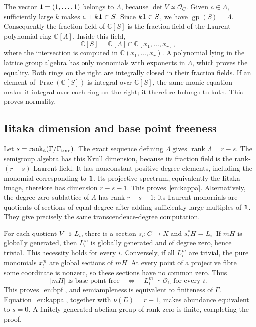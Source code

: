 \documentclass[12pt]{amsart}
\theoremstyle{definition}
\theoremstyle{remark}
\numberwithin{equation}{section}
\newcommand{\rank}{\operatorname{rank}}
\newcommand{\cO}{\mathcal{O}}
\newcommand{\Z}{\mathbb{Z}}
\newcommand{\C}{\mathbb{C}}
\DeclareMathOperator{\gp}{gp}
\begin{document}
The vector ${\bf1}=(1,\ldots,1)$ belongs to $\Lambda$, because $\det V\simeq\cO_C$. Given $a\in\Lambda$, sufficiently large $k$ makes $a+k{\bf1}\in S$. Since $k{\bf1}\in S$, we have $\gp(S)=\Lambda$. Consequently the fraction field of $\C[S]$ is the fraction field of the Laurent polynomial ring $\C[\Lambda]$. Inside this field,
\[
 \C[S]=\C[\Lambda]\cap\C[x_1,\ldots,x_r],
\]
where the intersection is computed in $\C(x_1,\ldots,x_r)$. A polynomial lying in the lattice group algebra has only monomials with exponents in $\Lambda$, which proves the equality. Both rings on the right are integrally closed in their fraction fields. If an element of $\operatorname{Frac}(\C[S])$ is integral over $\C[S]$, the same monic equation makes it integral over each ring on the right; it therefore belongs to both. This proves normality.

\subsection{Iitaka dimension and base point freeness}
Let $s=\rank_\Z(\Gamma/\Gamma_{\rm tors})$. The exact sequence defining $\Lambda$ gives $\rank\Lambda=r-s$. The semigroup algebra has this Krull dimension, because its fraction field is the rank-$(r-s)$ Laurent field. It has nonconstant positive-degree elements, including the monomial corresponding to ${\bf1}$. Its projective spectrum, equivalently the Iitaka image, therefore has dimension $r-s-1$. This proves~\eqref{en:kappa}. Alternatively, the degree-zero sublattice of $\Lambda$ has rank $r-s-1$; its Laurent monomials are quotients of sections of equal degree after adding sufficiently large multiples of ${\bf1}$. They give precisely the same transcendence-degree computation.

For each quotient $V\twoheadrightarrow L_i$, there is a section $s_i:C\to X$ and $s_i^*H=L_i$. If $mH$ is globally generated, then $L_i^m$ is globally generated and of degree zero, hence trivial. This necessity holds for every $i$. Conversely, if all $L_i^m$ are trivial, the pure monomials $x_i^m$ are global sections of $mH$. At every point of a projective fibre some coordinate is nonzero, so these sections have no common zero. Thus
\[
 |mH|\text{ is base point free}\quad\Longleftrightarrow\quad
 L_i^m\simeq\cO_C\text{ for every }i.
\]
This proves~\eqref{en:bpf}, and semiampleness is equivalent to finiteness of $\Gamma$. Equation~\eqref{en:kappa}, together with $\nu(D)=r-1$, makes abundance equivalent to $s=0$. A finitely generated abelian group of rank zero is finite, completing the proof.
\end{document}
